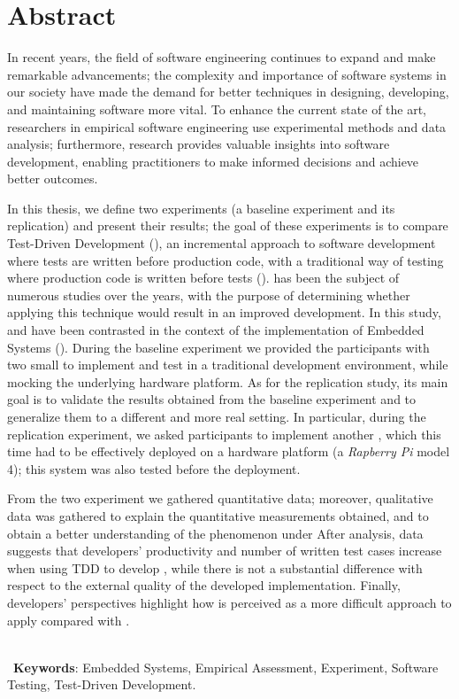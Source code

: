 \chapter*{Abstract}
In recent years, the field of software engineering continues to expand and make remarkable advancements; the complexity and importance of software systems in our society have made the demand for better techniques in designing, developing, and maintaining software more vital. To enhance the current state of the art, researchers in empirical software engineering use experimental methods and data analysis; furthermore, research provides valuable insights into software development, enabling practitioners to make informed decisions and achieve better outcomes.

In this thesis, we define two experiments (\ie a baseline experiment and its replication) and present their results; the goal of these experiments is to compare Test-Driven Development (\tdd), an incremental approach to software development where tests are written before production code, with a traditional way of testing where production code is written before tests (\ie \notdd). \tdd has been the subject of numerous studies over the years, with the purpose of determining whether applying this technique would result in an improved development. 
In this study, \tdd and \notdd have been contrasted in the context of the implementation of Embedded Systems (\ess).
During the baseline experiment we provided the participants with two small \ess to implement and test in a traditional development environment, while mocking the underlying hardware platform.
As for the replication study, its main goal is to validate the results obtained from the baseline experiment and to generalize them to a different and more real setting. 
In particular, during the replication experiment, we asked participants to implement another \es, which this time had to be effectively deployed on a hardware platform (a \textit{Rapberry Pi} model 4); this system was also tested before the deployment.

From the two experiment we gathered quantitative data; moreover, qualitative data was gathered to explain the quantitative measurements obtained, and to obtain a better understanding of the phenomenon under
After analysis, data suggests that developers' productivity and number of written test cases increase when using TDD to develop \ess, while there is not a substantial difference with respect to the external quality of the developed implementation. 
Finally, developers' perspectives highlight how \tdd is perceived as a more difficult approach to apply compared with \notdd.

\ \\ \
\noindent \textbf{Keywords}: Embedded Systems, Empirical Assessment, Experiment, Software Testing, Test-Driven Development.